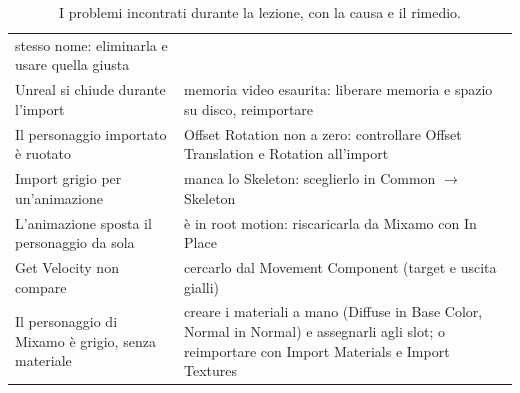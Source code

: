 \begin{table}[htbp]
\begin{tabular}{@{}p{5.4cm}p{8.6cm}@{}}
stesso nome: eliminarla e usare quella giusta \\
Unreal si chiude durante l'import & memoria video esaurita: liberare memoria e spazio su
disco, reimportare \\
Il personaggio importato è ruotato & Offset Rotation non a zero: controllare Offset
Translation e Rotation all'import \\
Import grigio per un'animazione & manca lo Skeleton: sceglierlo in Common
$\rightarrow$ Skeleton \\
L'animazione sposta il personaggio da sola & è in root motion: riscaricarla da Mixamo
con In Place \\
Get Velocity non compare & cercarlo dal Movement Component (target e uscita gialli) \\
Il personaggio di Mixamo è grigio, senza materiale & creare i materiali a mano (Diffuse
in Base Color, Normal in Normal) e assegnarli agli slot; o reimportare con Import
Materials e Import Textures \\
\bottomrule
\end{tabular}
\caption{I problemi incontrati durante la lezione, con la causa e il rimedio.}
\label{ue8:tab:errori}
\end{table}

